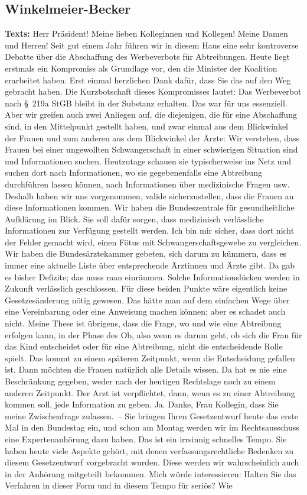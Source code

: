 \documentclass{article}
\begin{document}
\subsection{Winkelmeier-Becker}
\noindent\textbf{Texts:} Herr Präsident! Meine lieben Kolleginnen und Kollegen! Meine Damen und Herren! Seit gut einem Jahr führen wir in diesem Haus eine sehr kontroverse Debatte über die Abschaffung des Werbeverbots für Abtreibungen. Heute liegt erstmals ein Kompromiss als Grundlage vor, den die Minister der Koalition erarbeitet haben. Erst einmal herzlichen Dank dafür, dass Sie das auf den Weg gebracht haben. Die Kurzbotschaft dieses Kompromisses lautet: Das Werbeverbot nach § 219a StGB bleibt in der Substanz erhalten. Das war für uns essenziell. Aber wir greifen auch zwei Anliegen auf, die diejenigen, die für eine Abschaffung sind, in den Mittelpunkt gestellt haben, und zwar einmal aus dem Blickwinkel der Frauen und zum anderen aus dem Blickwinkel der Ärzte: Wir verstehen, dass Frauen bei einer ungewollten Schwangerschaft in einer schwierigen Situation sind und Informationen suchen. Heutzutage schauen sie typischerweise ins Netz und suchen dort nach Informationen, wo sie gegebenenfalls eine Abtreibung durchführen lassen können, nach Informationen über medizinische Fragen usw. Deshalb haben wir uns vorgenommen, valide sicherzustellen, dass die Frauen an diese Informationen kommen. Wir haben die Bundeszentrale für gesundheitliche Aufklärung im Blick. Sie soll dafür sorgen, dass medizinisch verlässliche Informationen zur Verfügung gestellt werden. Ich bin mir sicher, dass dort nicht der Fehler gemacht wird, einen Fötus mit Schwangerschaftsgewebe zu vergleichen. Wir haben die Bundesärztekammer gebeten, sich darum zu kümmern, dass es immer eine aktuelle Liste über entsprechende Ärztinnen und Ärzte gibt. Da gab es bisher Defizite; das muss man einräumen. Solche Informationslücken werden in Zukunft verlässlich geschlossen. Für diese beiden Punkte wäre eigentlich keine Gesetzesänderung nötig gewesen. Das hätte man auf dem einfachen Wege über eine Vereinbarung oder eine Anweisung machen können; aber es schadet auch nicht. Meine These ist übrigens, dass die Frage, wo und wie eine Abtreibung erfolgen kann, in der Phase des Ob, also wenn es darum geht, ob sich die Frau für das Kind entscheidet oder für eine Abtreibung, nicht die entscheidende Rolle spielt. Das kommt zu einem späteren Zeitpunkt, wenn die Entscheidung gefallen ist. Dann möchten die Frauen natürlich alle Details wissen. Da hat es nie eine Beschränkung gegeben, weder nach der heutigen Rechtslage noch zu einem anderen Zeitpunkt.  Der Arzt ist verpflichtet, dann, wenn es zu einer Abtreibung kommen soll, jede Information zu geben. Ja. Danke, Frau Kollegin, dass Sie meine Zwischenfrage zulassen. – Sie bringen Ihren Gesetzentwurf heute das erste Mal in den Bundestag ein, und schon am Montag werden wir im Rechtsausschuss eine Expertenanhörung dazu haben. Das ist ein irrsinnig schnelles Tempo. Sie haben heute viele Aspekte gehört, mit denen verfassungsrechtliche Bedenken zu diesem Gesetzentwurf vorgebracht wurden. Diese werden wir wahrscheinlich auch in der Anhörung mitgeteilt bekommen. Mich würde interessieren: Halten Sie das Verfahren in dieser Form und in diesem Tempo für seriös? Wie 
\end{document}
